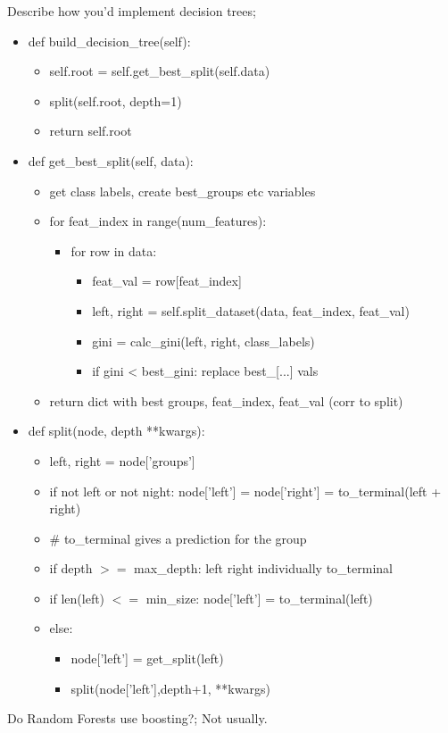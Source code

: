 \documentclass{article}
\begin{document}
Describe how you'd implement decision trees; \begin{itemize} \item def build\_decision\_tree(self): \begin{itemize} \item self.root = self.get\_best\_split(self.data) \item split(self.root, depth=1) \item return self.root \end{itemize} \item def get\_best\_split(self, data): \begin{itemize} \item get class labels, create best\_groups etc variables \item for feat\_index in range(num\_features):  \begin{itemize} \item for row in data: \begin{itemize} \item feat\_val = row[feat\_index] \item left, right = self.split\_dataset(data, feat\_index, feat\_val) \item gini = calc\_gini(left, right, class\_labels) \item if gini < best\_gini: replace best\_[...] vals \end{itemize} \end{itemize} \item return dict with best groups, feat\_index, feat\_val (corr to split) \end{itemize} \item def split(node, depth **kwargs): \begin{itemize} \item left, right = node['groups'] \item if not left or not night: node['left'] = node['right'] = to\_terminal(left + right) \item # to\_terminal gives a prediction for the group \item if depth $>=$ max\_depth: left right individually to\_terminal \item if len(left) $<=$ min\_size: node['left'] = to\_terminal(left) \item else:  \begin{itemize} \item node['left'] = get\_split(left) \item split(node['left'],depth+1, **kwargs) \end{itemize} \end{itemize} \end{itemize}

Do Random Forests use boosting?; Not usually.
\end{document}

